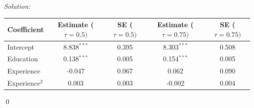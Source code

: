 \documentclass[12pt]{article}
\newenvironment{problem}[2][Problem]{\begin{trivlist}
\item[\hskip \labelsep {\bfseries #1}\hskip \labelsep {\bfseries #2.}]}{\end{trivlist}}
\newenvironment{sol}
    {\emph{Solution:}
    }
    {
    \qed
    }
\begin{document}
\begin{sol}
\begin{enumerate}[label=\alph*) ]
\begin{table}[htbp]
      \begin{tabular}{lcccc}
          \toprule
            Coefficient                & Estimate ($\tau = 0.5)$   & SE ($\tau = 0.5)$ &     Estimate ($\tau = 0.75)$   & SE ($\tau = 0.75)$          \\
          \midrule
          Intercept & 8.838$^{***}$ & 0.395 &  8.303$^{***}$ & 0.508\\
          Education & 0.138$^{***}$ & 0.005 & 0.154$^{***}$ & 0.005\\
          Experience & -0.047 & 0.067 & 0.062 & 0.090\\
          Experience$^2$ & 0.003 & 0.003 & -0.002 & 0.004\\
          \bottomrule
      \end{tabular}
    \label{tab:qreg}
  \end{table}
\end{enumerate}
\end{sol}
\begin{problem}{2}
\end{problem}
\end{document}

